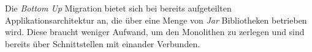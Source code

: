 	Die \textit{Bottom Up} Migration bietet sich bei bereits aufgeteilten Applikationsarchitektur an, die über eine Menge von \textit{Jar} Bibliotheken betrieben wird. Diese braucht weniger Aufwand, um den Monolithen zu zerlegen und sind bereits über Schnittstellen mit einander Verbunden. \cite{modulProgJava9,modulMitJava9}








